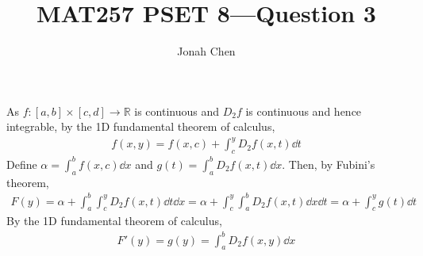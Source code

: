 \documentclass{exam}
\title{MAT257 PSET 8---Question 3}
\author{Jonah Chen}
\date{}
\numberwithin{equation}{section}
\newcommand{\R}{\mathbb{R}}
\begin{document}
    \sffamily
    \maketitle
    As $f:[a,b]\times[c,d]\to\R$ is continuous and $D_2f$ is continuous and hence integrable, by the 1D fundamental theorem of calculus, 
    \begin{align*}
        f(x,y)=f(x,c)+\int_c^yD_2f(x,t)\dd t
    \end{align*}
    Define $\alpha=\int_a^bf(x,c)\dd x$ and $g(t)=\int_a^bD_2f(x,t)\dd x$. Then, by Fubini's theorem,
    \begin{align*}
        F(y)=\alpha+\int_a^b\int_c^yD_2f(x,t)\dd t\dd x=\alpha+\int_c^y\int_a^bD_2f(x,t)\dd x\dd t=\alpha+\int_c^yg(t)\dd t
    \end{align*}
    By the 1D fundamental theorem of calculus,
    \begin{align*}
        F'(y)=g(y)=\int_a^bD_2f(x,y)\dd x
    \end{align*}
\end{document}
